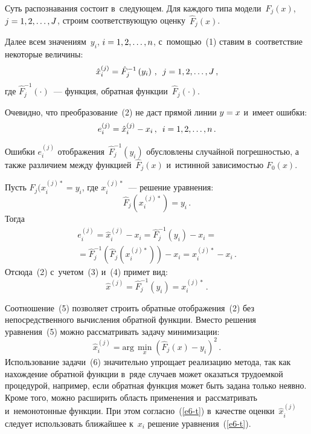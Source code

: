 \begin{multicols}{2}
  Суть распознавания состоит в~следующем. Для каждого типа 
модели~$F_j(x)$, $j\hm= 1,2,\ldots, J$, строим соответствующую 
оценку~$\hat{F}_j(x)$.
  
  Далее всем значениям~$y_i$, $i\hm= 1,2, \ldots, n$, с~по\-мощью~(1) ставим 
в~соответствие некоторые величины:
  \begin{equation}
  \hat{x}_i^{(j)} = \hat{F}_j^{-1}\left (y_i\right)\,,\enskip j=1,2,\ldots, J\,,
  \label{e2-t}
  \end{equation}
где $\hat{F}_j^{-1}(\cdot)$~--- функция, обратная функции~$\hat{F}_j(\cdot)$.

  Очевидно, что преобразование~(2) не даст прямой линии $y\hm=x$ и~имеет 
ошибки:
  $$
  e_i^{(j)} = \hat{x}_i^{(j)} -x_i\,,\enskip i=1,2,\ldots , n\,.
  $$
  
  Ошибки $e_i^{(j)}$ отображения~$\hat{F}_j^{-1}(y_i)$ обусловлены 
случайной погрешностью, а также различием между функцией~$\hat{F}_j(x)$ 
и~истинной зависимостью $F_0(x)$.
  
  Пусть $\hat{F}_j(x_i^{(j)*}= y_i$, где $x_i^{(j)*}$~--- решение уравнения:
  \begin{equation}
  \hat{F}_j\left(x_i^{(j)*}\right)=y_i\,.
  \label{e3-t}
  \end{equation}
Тогда
\begin{multline}
e_i^{(j)} =\hat{x}_i^{(j)} -x_i = \hat{F}_j^{-1}\left(y_i\right) -x_i = {}\\
{}=\hat{F}_j^{-1} 
\left( \hat{F}_j \left( x_i^{(j)*}\right)\right) -x_i = x_i^{(j)*}- x_i\,.
\label{e4-t}
  \end{multline}
Отсюда~(2) с~учетом~(3) и~(4) примет вид:
\begin{equation}
\hat{x}^{(j)} = \hat{F}_j^{-1} \left( y_i\right) =x_i^{(j)*}\,.
\label{e5-t}
  \end{equation}
  
  Соотношение~(5) позволяет строить обратные отображения~(2) без 
непосредственного вычисления обратной функции. Вместо решения 
уравнения~(5) можно рассматривать задачу минимизации:
  \begin{equation}
  \hat{x}_i^{(j)} = \mathrm{arg}\,\min\limits_x \left( \hat{F}_j(x)- y_i\right)^2\,.
  \label{e6-t}
  \end{equation}
  Использование задачи~(6) значительно упрощает реализацию метода, так как 
нахождение обратной функции в~ряде случаев может оказаться трудоемкой 
процедурой, например, если обратная функция может быть задана только 
неявно. Кроме того, можно расширить область применения и~рассматривать 
и~немонотонные функции. При этом согласно~(\ref{e6-t}) в~качестве 
оценки~$\hat{x}_i^{(j)}$ следует использовать ближайшее к~$x_i$ решение 
уравнения~(\ref{e6-t}).
  

\end{multicols}
